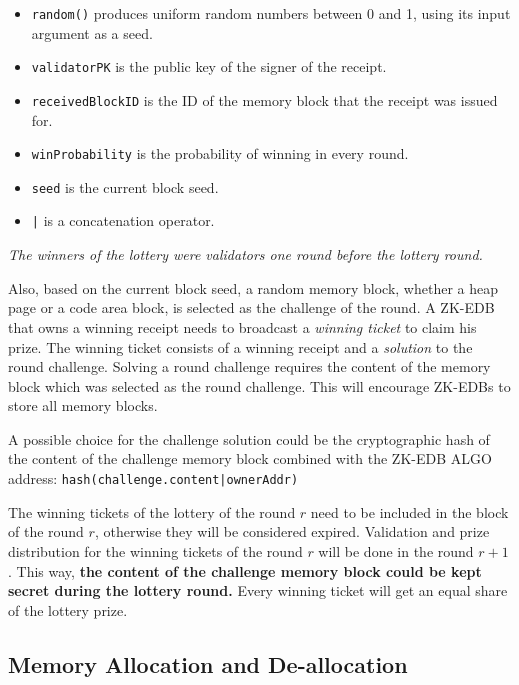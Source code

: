 \documentclass[11pt, A4]{report}
\begin{document}
    \begin{itemize}
        \item \texttt{random()} produces uniform random numbers between 0 and 1, using its input argument as a seed.
        \item \texttt{validatorPK} is the public key of the signer of the receipt.
        \item \texttt{receivedBlockID} is the ID of the memory block that the receipt was issued for.
        \item \texttt{winProbability} is the probability of winning in every round.
        \item \texttt{seed} is the current block seed.
        \item \texttt{|} is a concatenation operator.
    \end{itemize}

    \emph{The winners of the lottery were validators one round before the lottery round.}

    Also, based on the current block seed, a random memory block, whether a heap page or a code area block, is
    selected as the challenge of the round. A ZK-EDB that owns a winning receipt needs to broadcast a \emph{winning
    ticket} to claim his prize. The winning ticket consists of a winning receipt and a \emph{solution} to the round
    challenge. Solving a round challenge requires the content of the memory block which was selected as the round
    challenge. This will encourage ZK-EDBs to store all memory blocks.

    A possible choice for the challenge solution could be the cryptographic hash of the content of the challenge
    memory block combined with the ZK-EDB ALGO address: \texttt{hash(challenge.content|ownerAddr)}

    The winning tickets of the lottery of the round \(r\) need to be included in the block of the round \(r\),
    otherwise they will be considered expired. Validation and prize distribution for the winning tickets of the round
    \(r\) will be done in the round \(r + 1\). This way, \textbf{the content of the challenge memory block could be
    kept secret during the lottery round.} Every winning ticket will get an equal share of the lottery prize.

    \subsection{Memory Allocation and De-allocation}\label{subsec:memory-allocation-and-de-allocation}
\end{document}
